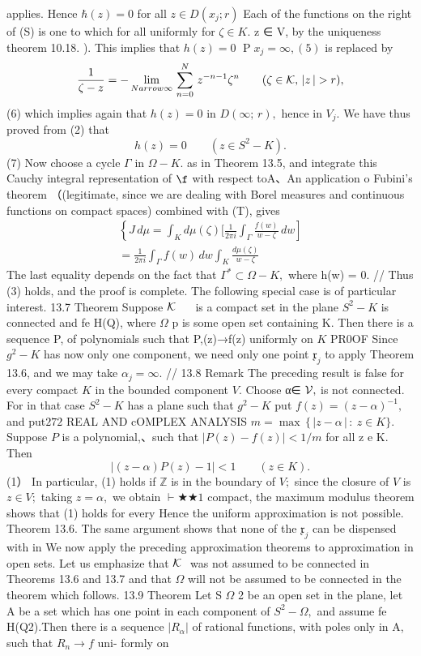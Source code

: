 applies. Hence $\hbar(z)=0$ for all $z\in D(x_{j};r)$ Each of the functions on the right of (S) is one to which for all uniformly for $\zeta\in K.$ z ∈ V, by the uniqueness theorem 10.18. ). This implies that $h(z)=0$ $\operatorname{P}x_{j}=\infty,(5)$ is replaced by $$ \frac{1}{\zeta-z}=-\operatorname*{lim}_{N arrow\infty}\,\sum_{n=0}^{N}\,z^{-n-1}\zeta^{n}\qquad(\zeta\in{\cal K},\,\vert z\,\vert>r), $$ (6) which implies again that $h(z)=0$ in $D(\infty;\,r),$ hence in $V_{j}.$ We have thus proved from (2) that $$ h(z)=0\qquad(z\in S^{2}-K). $$ (7) Now choose a cycle ${\Gamma}$ in $\Omega-K.$ as in Theorem 13.5, and integrate this Cauchy integral representation of $\boldsymbol{\f}$ with respect toA、An application o Fubini's theorem （(legitimate, since we are dealing with Borel measures and continuous functions on compact spaces) combined with (T), gives $$ \begin{array}{c}{{\left\{J\,d\mu=\displaystyle\int_{K}d\mu(\zeta)\displaystyle [{\frac{1}{2\pi i}}\int_{\Gamma}{\frac{f(w)}{w-\zeta}}\,d w\right]}}\\ {{={\frac{1}{2\pi i}}\displaystyle\int_{\Gamma}f(w)\,d w\displaystyle\int_{K}{\frac{d\mu(\zeta)}{w-\zeta}}}}\end{array} $$ The last equality depends on the fact that $\Gamma^{*}\subset\Omega-K,$ where h(w) = 0. // Thus (3) holds, and the proof is complete. The following special case is of particular interest. 13.7 Theorem Suppose ${\cal K}\,\,\,\,\,\,\,\,$ is a compact set in the plane $\scriptstyle{S^{2}-K}$ is connected and fe H(Q), where $\Omega$ p is some open set containing K. Then there is a sequence {P,} of polynomials such that P,(z)→f(z) uniformly on $\textstyle K$ PR0OF Since $\scriptstyle{g^{2}-K}$ has now only one component, we need only one point ${\mathfrak{x}}_{j}$ to apply Theorem 13.6, and we may take $\alpha_{j}=\infty.$ // 13.8 Remark The preceding result is false for every compact $\textstyle K$ in the bounded component $V.$ Choose α∈ ${\cal{V}},$ is not connected. For in that case $\scriptstyle{S^{2}-K}$ has a plane such that $\scriptstyle{g^{2}-K}$ put $f(z)=(z-\alpha)^{-1},$ and put$272$ REAL AND cOMPLEX ANALYSIS $m=\operatorname*{max}\,\{\,|z-\alpha\,|\,\colon\ z\in K\}.$ Suppose ${\mathbf{}}P$ is a polynomial,、such that $|P(z)-f(z)|<1/m$ for all z e K. Then $$ |(z-\alpha)P(z)-1|<1\qquad(z\in K). $$ (1） In particular, (1) holds if $\mathbb{Z}$ is in the boundary of $V;$ since the closure of ${\mathbf{}}V$ is $z\in V;$ taking $z=\alpha,$ we obtain $\vdash\bigstar\bigstar1$ compact, the maximum modulus theorem shows that (1) holds for every Hence the uniform approximation is not possible. Theorem 13.6. The same argument shows that none of the ${\mathfrak{x}}_{j}$ can be dispensed with in We now apply the preceding approximation theorems to approximation in open sets. Let us emphasize that ${\cal K}\,\,$ was not assumed to be connected in Theorems 13.6 and 13.7 and that $\Omega$ will not be assumed to be connected in the theorem which follows. 13.9 Theorem Let S $\Omega$ 2 be an open set in the plane, let A be a set which has one point in each component of $S^{2}-\Omega,$ and assume fe H(Q2).Then there is a sequence $|R_{\alpha}|$ of rational functions, with poles only in A, such that $R_{n}{\xrightarrow{}}f$ uni- formly on 